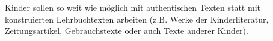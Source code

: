 Kinder sollen so weit wie möglich mit authentischen Texten statt mit konstruierten Lehrbuchtexten arbeiten (z.B. Werke der Kinderliteratur, Zeitungsartikel, Gebrauchstexte oder auch Texte anderer Kinder).